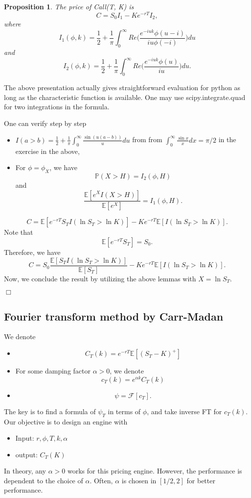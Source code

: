 \documentclass{article}
\newtheorem{proposition}[theorem]{Proposition}
\newenvironment{proof}{\noindent {\sc Proof:}}{$\Box$} %
\begin{document}
\begin{proposition}
The price of Call(T, K) is
$$ C = S_0 I_1 - K e^{-rT} I_2,$$
where
$$I_1(\phi, k) = \frac 1 2 + \frac 1 \pi \int_0^\infty Re \Big( \frac{e^{-iu k} \phi(u - i)}{iu \phi(-i)} \Big) du$$
and 
$$I_2(\phi, k) = \frac 1 2 + \frac 1 \pi \int_0^\infty Re \Big( \frac{e^{-iu k} \phi(u)}{iu} \Big) du.$$
\end{proposition}

The above presentation actually gives straightforward evaluation for python as long as the characteristic function is available. One may use scipy.integrate.quad for two integrations in the formula.


\begin{proof}
One can verify step by step
\begin{itemize}
\item 
$I(a>b) = \frac 1 2 + \frac 1 \pi \int_0^\infty \frac{\sin (u(a-b))}{u} du$ from from $\int_0^\infty \frac{\sin x}{x} dx = \pi/2$ in 
the exercise in the above, 
\item
For $\phi = \phi_X$, we have
$$\mathbb P(X>H) = I_2(\phi, H)$$
and
$$\frac{\mathbb E[e^X I(X>H)]}{\mathbb E[ e^X]} = I_1(\phi, H).$$
\end{itemize}

$$C = \mathbb E [ e^{-rT} S_T I(\ln S_T > \ln K)] - K e^{-rT} \mathbb E [ I(\ln S_T > \ln K)].$$
Note that 
$$ \mathbb E[e^{-rT} S_T] = S_0.$$
Therefore, we have
$$C = S_0 
\frac{\mathbb E [ S_T I(\ln S_T > \ln K)]}{\mathbb E[S_T]} - K e^{-rT} \mathbb E [ I(\ln S_T > \ln K)].$$
Now, we conclude the result by utilizing the above lemmas with $X = \ln S_T$.

\end{proof}


\subsection{Fourier transform method by Carr-Madan}
We denote
\begin{itemize}
\item $$C_T(k) = e^{-rT} \mathbb E[(S_T - K)^+]$$
\item For some damping factor $\alpha>0$, we denote
$$c_T(k) = e^{\alpha k} C_T(k)$$
\item $$\psi = \mathcal F[c_T].$$
\end{itemize}

The key is to find a formula of $\psi_T$ in terms of $\phi$, and take inverse FT for $c_T(k)$. 
Our objective is to design an engine with
\begin{itemize}
\item
Input: $r, \phi, T, k, \alpha$
\item
output: $C_T(K)$
\end{itemize}
In theory, any $\alpha>0$ works for this pricing engine. However, the performance is dependent to the choice of $\alpha$.
Often, $\alpha$ is chosen in $[1/2, 2]$ for better performance.
\end{document}
